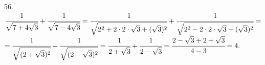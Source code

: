 56. $\cfrac{1}{\sqrt{7+4\sqrt{3}}}+\cfrac{1}{\sqrt{7-4\sqrt{3}}}=\cfrac{1}{\sqrt{2^2+2\cdot2\cdot\sqrt{3}+(\sqrt{3})^2}}+\cfrac{1}{\sqrt{2^2-2\cdot2\cdot\sqrt{3}+(\sqrt{3})^2}}=$\\
$=\cfrac{1}{\sqrt{(2+\sqrt{3})^2}}+\cfrac{1}{\sqrt{(2-\sqrt{3})^2}}=\cfrac{1}{2+\sqrt{3}}+\cfrac{1}{2-\sqrt{3}}=
\cfrac{2-\sqrt{3}+2+\sqrt{3}}{4-3}=4.$\\
